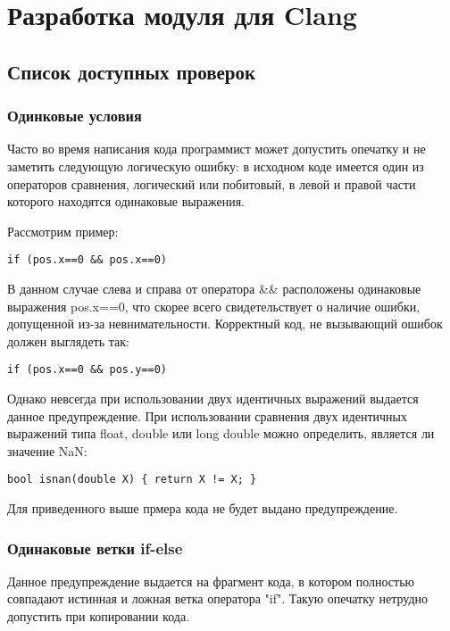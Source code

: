 \chapter{Разработка модуля для Clang}

\section{Список доступных проверок}

\subsection{Одинковые условия}
\label{sec:eqBin}
Часто во время написания кода программист может допустить опечатку и не заметить следующую
логическую ошибку: в исходном коде имеется один из операторов сравнения, логический или побитовый, в левой 
и правой части которого находятся одинаковые выражения. 

Рассмотрим пример:
\begin{lstlisting}
if (pos.x==0 && pos.x==0)
\end{lstlisting}

В данном случае слева и справа от оператора \&\& расположены одинаковые выражения pos.x==0,
что скорее всего свидетельствует о наличие ошибки, допущенной из-за невнимательности. Корректный код,
не вызывающий ошибок должен выглядеть так:
\begin{lstlisting}
if (pos.x==0 && pos.y==0)
\end{lstlisting}

Однако невсегда при использовании двух идентичных выражений выдается данное предупреждение. 
При использовании сравнения двух идентичных выражений типа float, double или long double можно определить,
является ли значение NaN:
\begin{lstlisting}
bool isnan(double X) { return X != X; }
\end{lstlisting}
Для приведенного выше прмера кода не будет выдано предупреждение.

\subsection{Одинаковые ветки if-else}
\label{sec:eqStmt}
Данное предупреждение выдается на фрагмент кода, в котором полностью совпадают истинная и ложная ветка 
оператора "if". Такую опечатку нетрудно допустить при копировании кода.

